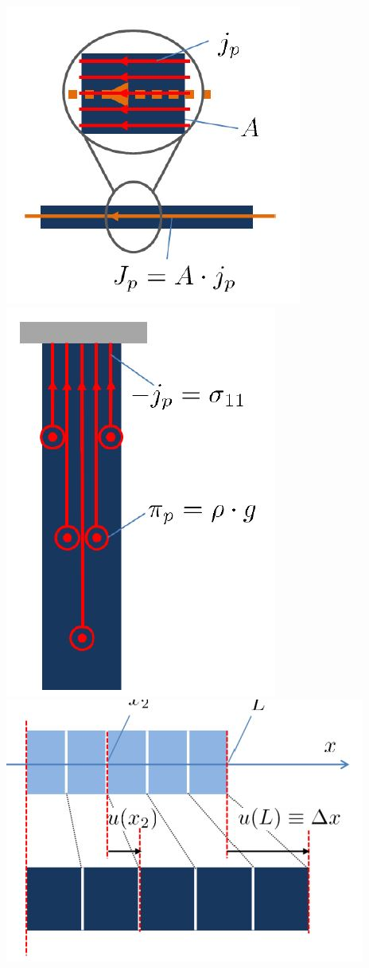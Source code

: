 		\includegraphics[scale=.3]{images/momflux}
		\includegraphics[scale=.3]{images/momfluxdensity}
		\includegraphics[scale=.3]{images/strain}


